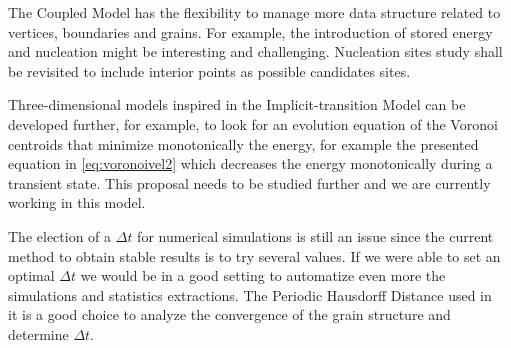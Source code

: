 The Coupled Model has the flexibility to manage more data structure related to vertices, boundaries and grains. 
For example, the introduction of stored energy and nucleation might be interesting and challenging. Nucleation sites study shall be revisited to include interior points as possible candidates sites.

Three-dimensional models inspired in the Implicit-transition Model can be developed further, for example, to look for an evolution equation of the Voronoi centroids that minimize monotonically the energy, for example the presented equation in \eqref{eq:voronoivel2} which decreases the energy monotonically during a transient state. This proposal needs to be studied further and we are currently working in this model.

The election of a $\Delta t$ for numerical simulations is still an issue since the current method to obtain stable results is to try several values. If we were able to set an optimal $\Delta t$  we would be in a good setting to automatize even more the simulations and statistics extractions. The Periodic Hausdorff Distance used in~\cite{bachelorthesismunoz} it is a good choice to analyze the convergence of the grain structure and determine $\Delta t$.


  
  
  
  
  
 
    
    

